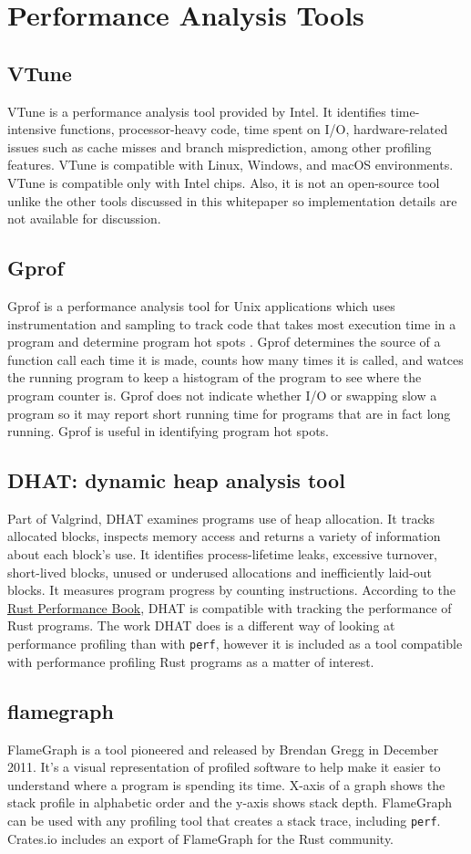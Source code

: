 \documentclass{article}
\begin{document}
\section{Performance Analysis Tools}
\subsection{VTune}
VTune is a performance analysis tool provided by Intel. It identifies
time-intensive functions, processor-heavy code, time spent on I/O,
hardware-related issues such as cache misses and branch misprediction, among
other profiling features. VTune is compatible with Linux, Windows, and macOS
environments. VTune is compatible only with Intel chips. Also, it is not an
open-source tool unlike the other tools discussed in this whitepaper so
implementation details are not available for discussion.
\subsection{Gprof}
Gprof is a performance analysis tool for Unix applications which uses
instrumentation and sampling to track code that takes most execution time in a
program and determine program hot spots . Gprof determines the source of a
function call each time it is made, counts how many times it is called, and
watces the
running program to keep a histogram of the program to see where the program
counter is. Gprof does not indicate whether I/O or swapping slow a program so it
may report short running time for programs that are in fact long running. Gprof
is useful in identifying program hot spots.
\subsection{DHAT: dynamic heap analysis tool}
Part of Valgrind, DHAT examines programs use of heap allocation. It tracks
allocated blocks, inspects memory access and returns a variety of information
about each block's use. It identifies process-lifetime leaks, excessive
turnover, short-lived blocks, unused or underused allocations and inefficiently
laid-out blocks. It measures program progress by counting instructions.
According to the \underline{Rust Performance Book}, DHAT is compatible with
tracking the performance of Rust programs. The work DHAT does is a different way
of looking at performance profiling than with \texttt{perf}, however it is
included as a tool compatible with performance profiling Rust programs as a
matter of interest.
\subsection{flamegraph}
FlameGraph is a tool pioneered and released by Brendan Gregg in December 2011.
It's a visual representation of profiled software to help make it easier to
understand where a program is spending its time. X-axis of a graph shows the
stack profile in alphabetic order and the y-axis shows stack depth. FlameGraph
can be used with any profiling tool that creates a stack trace, including
\texttt{perf}. Crates.io includes an export of FlameGraph for the Rust community.
\end{document}
